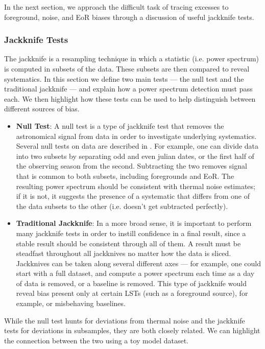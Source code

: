 \documentclass[preprint2,numberedappendix,tighten]{aastex6}  %
\begin{document}
In the next section, we approach the difficult task of tracing excesses to foreground, noise, and EoR biases through a discussion of useful jackknife tests.

\subsubsection{Jackknife Tests}
\label{sec:JackknifeOverview}

The jackknife is a resampling technique in which a statistic (i.e. power spectrum) is computed in subsets of the data. These subsets are then compared to reveal systematics. In this section we define two main tests --- the null test and the traditional jackknife --- and explain how a power spectrum detection must pass each. We then highlight how these tests can be used to help distinguish between different sources of bias.
 
\begin{itemize}
\item \textbf{Null Test}: A null test is a type of jackknife test that removes the astronomical signal from data in order to investigate underlying systematics. Several null tests on data are described in \citet{keating_et_al2016}. For example, one can divide data into two subsets by separating odd and even julian dates, or the first half of the observing season from the second. Subtracting the two removes signal that is common to both subsets, including foregrounds and EoR. The resulting power spectrum should be consistent with thermal noise estimates; if it is not, it suggests the presence of a systematic that differs from one of the data subsets to the other (i.e. doesn't get subtracted perfectly). 
\item \textbf{Traditional Jackknife}: In a more broad sense, it is important to perform many jackknife tests in order to instill confidence in a final result, since a stable result should be consistent through all of them. A result must be steadfast throughout all jackknives no matter how the data is sliced. Jackknives can be taken along several different axes --- for example, one could start with a full dataset, and compute a power spectrum each time as a day of data is removed, or a baseline is removed. This type of jackknife would reveal bias present only at certain LSTs (such as a foreground source), for example, or misbehaving baselines.
\end{itemize}

While the null test hunts for deviations from thermal noise and the jackknife tests for deviations in subsamples, they are both closely related. We can highlight the connection between the two using a toy model dataset.
\end{document}
